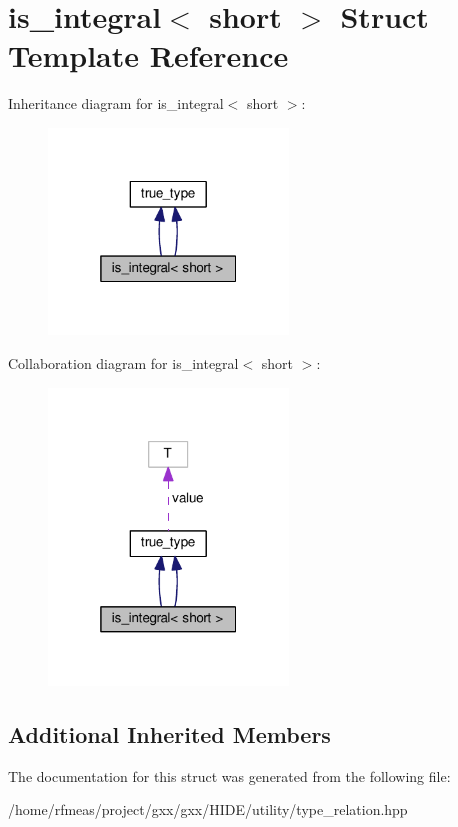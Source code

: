 \hypertarget{structis__integral_3_01short_01_4}{}\section{is\+\_\+integral$<$ short $>$ Struct Template Reference}
\label{structis__integral_3_01short_01_4}


Inheritance diagram for is\+\_\+integral$<$ short $>$\+:
\nopagebreak
\begin{figure}[H]
\begin{center}
\leavevmode
\includegraphics[width=181pt]{structis__integral_3_01short_01_4__inherit__graph}
\end{center}
\end{figure}


Collaboration diagram for is\+\_\+integral$<$ short $>$\+:
\nopagebreak
\begin{figure}[H]
\begin{center}
\leavevmode
\includegraphics[width=181pt]{structis__integral_3_01short_01_4__coll__graph}
\end{center}
\end{figure}
\subsection*{Additional Inherited Members}


The documentation for this struct was generated from the following file\+:\begin{DoxyCompactItemize}
\item 
/home/rfmeas/project/gxx/gxx/\+H\+I\+D\+E/utility/type\+\_\+relation.\+hpp\end{DoxyCompactItemize}

